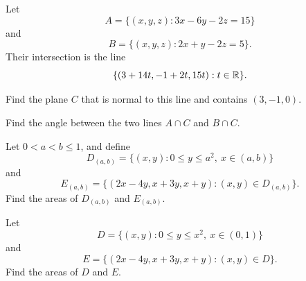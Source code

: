 \begin{problem}
Let
\[
A=\{(x,y,z):3x-6y-2z=15\}
\]
and
\[
B=\{(x,y,z):2x+y-2z=5\}.
\]
Their intersection is the line
\[
\{(3+14t,-1+2t,15t):t\in\mathbb{R}\}.
\]
\begin{problemsubparts}
\item Find the plane $C$ that is normal to this line and contains $(3,-1,0)$.
\item Find the angle between the two lines $A\cap C$ and $B\cap C$.
\end{problemsubparts}
\end{problem}

\begin{problem}
\begin{problemsubparts}
\item Let $0<a<b\le1$, and define
\[
D_{(a,b)}=\{(x,y):0\le y\le a^2,\ x\in(a,b)\}
\]
and
\[
E_{(a,b)}
=
\{(2x-4y,x+3y,x+y):(x,y)\in D_{(a,b)}\}.
\]
Find the areas of $D_{(a,b)}$ and $E_{(a,b)}$.
\item Let
\[
D=\{(x,y):0\le y\le x^2,\ x\in(0,1)\}
\]
and
\[
E=\{(2x-4y,x+3y,x+y):(x,y)\in D\}.
\]
Find the areas of $D$ and $E$.
\end{problemsubparts}
\end{problem}

